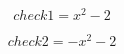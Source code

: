 \documentclass[letterpaper, 8pt]{extarticle}
\begin{document}
\begin{dmath*}
check1 =
    x^{2} - 2
\end{dmath*}


\begin{dmath*}
check2 =
    - x^{2} - 2
\end{dmath*}
\end{document}
